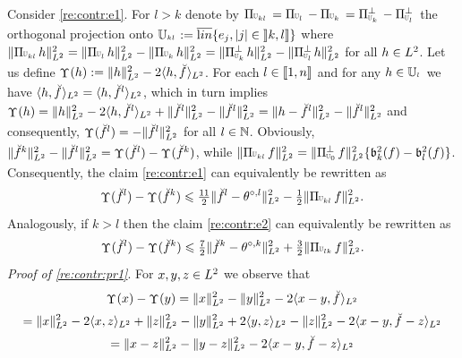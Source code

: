 \begin{pro}
Consider \ref{re:contr:e1}. For $l>k$ denote by 
 $\dProj{k}{l}=\Proj[{\mHiH[l]}]-\Proj[{\mHiH[k]}]=\ProjC[{\mHiH[k]}]-\ProjC[{\mHiH[l]}]$  the
orthogonal projection onto $\dmHiH{k}{l}:=\lin\{\bas_j,|j|\in\nsetlo{k,l}\}$
where
$\VnormLp{\dProj{k}{l}\He}^2=\VnormLp{\dProj{l}{}\He}^2-\VnormLp{\dProj{k}{}\He}^2=\VnormLp{\dProjC{k}{}\He}^2-\VnormLp{\dProjC{l}{}\He}^2$
for all $\He\in\Lp^2$. 
Let us define
$\contr[](\He):=\VnormLp{\He}^2-2\VskalarLp{\He,\dxdfPr[]}$. For
each $l\in\nset{1,n}$ and for any $\He\in\mHiH[l]$ we have
$\VskalarLp{\He,\dxdfPr[]}=\VskalarLp{\He,\dxdfPr[l]}$, which in
turn implies $\contr[](\He)=\VnormLp{\He}^2-2\VskalarLp{\He,\dxdfPr[l]}+\VnormLp{\dxdfPr[l]}^2-\VnormLp{\dxdfPr[l]}^2=\VnormLp{\He-\dxdfPr[l]}^2-\VnormLp{\dxdfPr[l]}^2$
and consequently, $\contr[](\dxdfPr[l])=-\VnormLp{\dxdfPr[l]}^2$ for all
$l\in\Nz$. Obviously,
$\VnormLp{\dxdfPr[k]}^2-\VnormLp{\dxdfPr[l]}^2=\contr[](\dxdfPr[l])-\contr[](\dxdfPr[k])$,
while
$\VnormLp{\dProj{k}{l}\xdf}^2=\VnormLp{\Proj[{\mHiH[0]}]^\perp\xdf}^2\{\bias[k]^2(\xdf)-\bias[l]^2(\xdf)\}$. Consequently,
the claim \ref{re:contr:e1} can equivalently be rewritten as
\begin{equation}\label{re:contr:pr1}
\contr[](\dxdfPr[l])-\contr[](\dxdfPr[k])
\leq \tfrac{11}{2}\VnormLp{\dxdfPr[l]-\xdfPr[l]}^2-\tfrac{1}{2}\VnormLp{\dProj{k}{l}\xdf}^2.
\end{equation}
Analogously, if $k>l$ then the claim \ref{re:contr:e2} can equivalently be rewritten as
\begin{equation}\label{re:contr:pr2}
\contr[](\dxdfPr[l])-\contr[](\dxdfPr[k])
\leq \tfrac{7}{2}\VnormLp{\dxdfPr[k]-\xdfPr[k]}^2+\tfrac{3}{2}
\VnormLp{\dProj{l}{k}\xdf}^2.
\end{equation}
\textit{Proof of \eqref{re:contr:pr1}}. For $x,y,z\in\Lp^2$ we observe that
\begin{multline*}
\contr[](x)-\contr[](y)%
=\VnormLp{x}^2-\VnormLp{y}^2-2\VskalarLp{x-y,\dxdfPr[]}\\
=\VnormLp{x}^2-2\VskalarLp{x,z}+\VnormLp{z}^2-\VnormLp{y}^2+2\VskalarLp{y,z}-\VnormLp{z}^2-2\VskalarLp{x-y,\dxdfPr[]-z}\\
= \VnormLp{x-z}^2-\VnormLp{y-z}^2-2\VskalarLp{x-y,\dxdfPr[]-z}

\end{multline*}
\end{pro}
